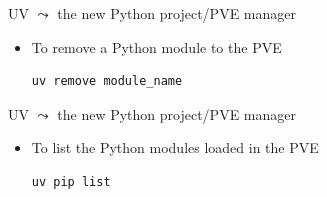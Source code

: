 \documentclass[11pt, serif, mathserif, compress]{beamer}  %
\newcommand{\boldtt}[1]{{\ttfamily\bfseries #1}}
\begin{document}
\begin{frame}[fragile]{UV $\leadsto$ the new Python project/PVE manager}

  \begin{tcolorbox}[title={\bf uv} command: \boldtt{remove}, add to width=5mm]
    \begin{itemize}
    \item To remove a Python module to the PVE
      \begin{verbatim}
uv remove module_name
      \end{verbatim}
    \end{itemize}
  \end{tcolorbox}

  
\end{frame}


\begin{frame}[fragile]{UV $\leadsto$ the new Python project/PVE manager}

  \begin{tcolorbox}[title={\bf uv} command: \boldtt{pip list}, add to width=5mm]
    \begin{itemize}\setlength\itemsep{0mm}
    \item To list the Python modules loaded in the PVE
      \begin{verbatim}
uv pip list
      \end{verbatim}
    \end{itemize}
  \end{tcolorbox}

\end{frame}
\end{document}

